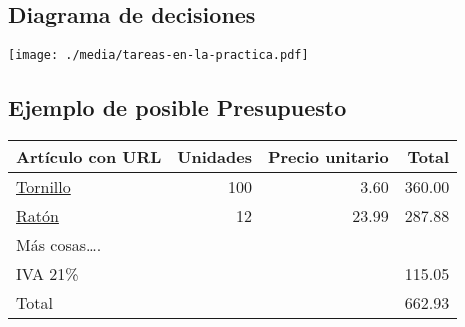 \documentclass[a4paper]{article}
\renewcommand{\includegraphics}[2][]{\IfFileExists{#2.pdf}{\originalincludegraphics[#1]{#2.pdf}}{\originalincludegraphics[#1]{#2}}}
\begin{document}
\subsection{Diagrama de decisiones}
\label{sec:org0000012}
\begin{center}
\texttt{[image: ./media/tareas-en-la-practica.pdf]}
\end{center}


\subsection{Ejemplo de posible Presupuesto}
\label{sec:org0000015}
\begin{center}
\begin{tabular}{lrrr}
Artículo con URL & Unidades & Precio unitario & Total\\[0pt]
\hline
\href{https://www.tornillos-online.com/975a2es.html}{Tornillo} & 100 & 3.60 & 360.00\\[0pt]
\href{https://www.pccomponentes.com/hp-pavilion-200-raton-gaming-3200-dpi}{Ratón} & 12 & 23.99 & 287.88\\[0pt]
Más cosas\ldots{}. &  &  & \\[0pt]
\hline
IVA 21\% &  &  & 115.05\\[0pt]
Total &  &  & 662.93\\[0pt]
\hline
\end{tabular}
\end{center}
\end{document}
